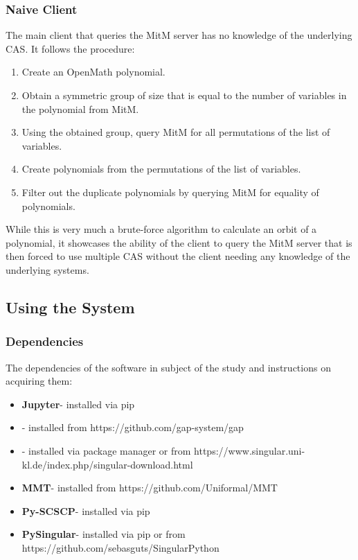 \subsubsection{Naive Client}
The main client that queries the MitM server has no knowledge of the underlying 
CAS. It follows the procedure:
\begin{enumerate}
  \item Create an OpenMath polynomial.
  \item Obtain a symmetric group of size that is equal to the number of variables 
    in the polynomial from MitM.
  \item Using the obtained group, query MitM for all permutations of the list 
    of variables.
  \item Create polynomials from the permutations of the list of variables.
  \item Filter out the duplicate polynomials by querying MitM for equality of 
    polynomials.
\end{enumerate}
While this is very much a brute-force algorithm to calculate an orbit of a
polynomial, it showcases the ability of the client to query the MitM server that 
is then forced to use multiple CAS without the client needing any knowledge of the
underlying systems.

\subsection{Using the System}
\subsubsection{Dependencies}
The dependencies of the software in subject of the study and instructions on
acquiring them:
\begin{itemize}
  \item \textbf{Jupyter}- installed via pip
  \item \textbf{\GAP}- installed from https://github.com/gap-system/gap
  \item \textbf{\Singular}- installed via package manager or from
    https://www.singular.uni-kl.de/index.php/singular-download.html
  \item \textbf{MMT}- installed from https://github.com/Uniformal/MMT
  \item \textbf{Py-SCSCP}- installed via pip
  \item \textbf{PySingular}- installed via pip or from 
    https://github.com/sebasguts/SingularPython
\end{itemize}

